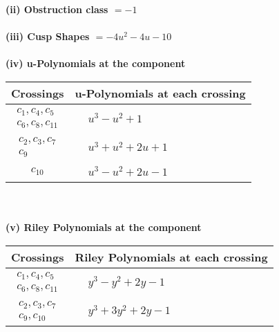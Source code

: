\documentclass[1p]{elsarticle_modified}
\theoremstyle{definition}
\begin{document}
\flushleft \textbf{(ii) Obstruction class $= -1$}\\~\\
\flushleft \textbf{(iii) Cusp Shapes $= -4 u^2-4 u-10$}\\~\\
\newpage\renewcommand{\arraystretch}{1}
\flushleft \textbf{(iv) u-Polynomials at the component}\newline \\
\begin{tabular}{m{50pt}|m{274pt}}
Crossings & \hspace{64pt}u-Polynomials at each crossing \\
\hline $$\begin{aligned}c_{1},c_{4},c_{5}\\c_{6},c_{8},c_{11}\end{aligned}$$&$\begin{aligned}
&u^3- u^2+1
\end{aligned}$\\
\hline $$\begin{aligned}c_{2},c_{3},c_{7}\\c_{9}\end{aligned}$$&$\begin{aligned}
&u^3+u^2+2 u+1
\end{aligned}$\\
\hline $$\begin{aligned}c_{10}\end{aligned}$$&$\begin{aligned}
&u^3- u^2+2 u-1
\end{aligned}$\\
\hline
\end{tabular}\\~\\
\newpage\renewcommand{\arraystretch}{1}
\flushleft \textbf{(v) Riley Polynomials at the component}\newline \\
\begin{tabular}{m{50pt}|m{274pt}}
Crossings & \hspace{64pt}Riley Polynomials at each crossing \\
\hline $$\begin{aligned}c_{1},c_{4},c_{5}\\c_{6},c_{8},c_{11}\end{aligned}$$&$\begin{aligned}
&y^3- y^2+2 y-1
\end{aligned}$\\
\hline $$\begin{aligned}c_{2},c_{3},c_{7}\\c_{9},c_{10}\end{aligned}$$&$\begin{aligned}
&y^3+3 y^2+2 y-1
\end{aligned}$\\
\hline
\end{tabular}\\~\\
\end{document}
